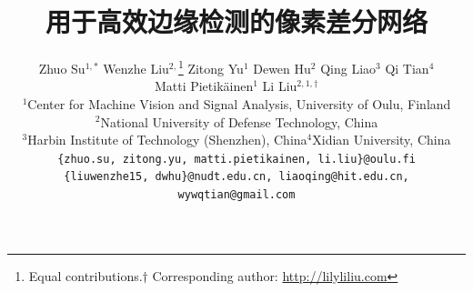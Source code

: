 \documentclass[10pt,twocolumn,letterpaper]{article}
\begin{document}
\title{用于高效边缘检测的像素差分网络}


\author{Zhuo Su$^{1,\ast}$\;\;\;\;\;
Wenzhe Liu$^{2,}$\thanks{Equal contributions.\;\;\;$\dagger$ Corresponding author: \href{http://lilyliliu.com}{http://lilyliliu.com}}\;\;\;\;\;
Zitong Yu$^1$\;\;\;\;\;
Dewen Hu$^2$\;\;\;\;\;
Qing Liao$^3$\;\;\;\;\;
Qi Tian$^4$\\
Matti Pietik{\"a}inen$^1$\;\;\;\;\;
Li Liu$^{2,1,\dagger}$\\
$^1$Center for Machine Vision and Signal Analysis, University of Oulu, Finland\\
$^2$National University of Defense Technology, China\\
$^3$Harbin Institute of Technology (Shenzhen), China\;\;\;\;\;$^4$Xidian University, China\\
{\tt\small \{zhuo.su, zitong.yu, matti.pietikainen, li.liu\}@oulu.fi}\\ 
{\tt\small \{liuwenzhe15, dwhu\}@nudt.edu.cn, liaoqing@hit.edu.cn, wywqtian@gmail.com}
}




\maketitle
\ificcvfinal\thispagestyle{empty}\fi
\end{document}
